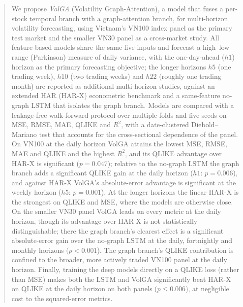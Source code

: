 \documentclass{llncs}
\begin{document}
\begin{abstract}
We propose \emph{VolGA} (Volatility Graph-Attention), a model that fuses a per-stock temporal branch
with a graph-attention branch, for multi-horizon volatility forecasting, using Vietnam's VN100 index
panel as the primary test market and the smaller VN30 panel as a cross-market study. All
feature-based models share the same five inputs and forecast a high--low range (Parkinson) measure of
daily variance, with the one-day-ahead ($h1$) horizon as the primary forecasting objective; the longer horizons $h5$ (one trading week), $h10$ (two trading weeks) and $h22$ (roughly one trading month) are reported as additional multi-horizon studies, against an extended HAR (HAR-X)
econometric benchmark and a same-feature no-graph LSTM that isolates the graph branch. Models are
compared with a leakage-free walk-forward protocol over multiple folds and five seeds on MSE, RMSE,
MAE, QLIKE and $R^2$, with a date-clustered Diebold--Mariano test that accounts for the
cross-sectional dependence of the panel. On VN100 at the daily horizon VolGA attains the lowest MSE,
RMSE, MAE and QLIKE and the highest $R^2$, and its QLIKE advantage over HAR-X is significant
($p=0.047$); relative to the no-graph LSTM the graph branch adds a significant QLIKE gain at the daily
horizon ($h1$: $p=0.006$), and against HAR-X VolGA's absolute-error advantage is significant at the
weekly horizon ($h5$: $p=0.001$). At the longer horizons the linear HAR-X is the strongest on QLIKE
and MSE, where the models are otherwise close. On the smaller VN30 panel VolGA leads on every metric
at the daily horizon, though its advantage over HAR-X is not statistically distinguishable; there the
graph branch's clearest effect is a significant absolute-error gain over the no-graph LSTM at the
daily, fortnightly and monthly horizons ($p<0.001$). The graph branch's QLIKE contribution is confined
to the broader, more actively traded VN100 panel at the daily horizon. Finally, training the deep
models directly on a QLIKE loss (rather than MSE) makes both the LSTM and VolGA significantly beat
HAR-X on QLIKE at the daily horizon on both panels ($p\le0.006$), at negligible cost to the
squared-error metrics.
\end{abstract}
\end{document}
